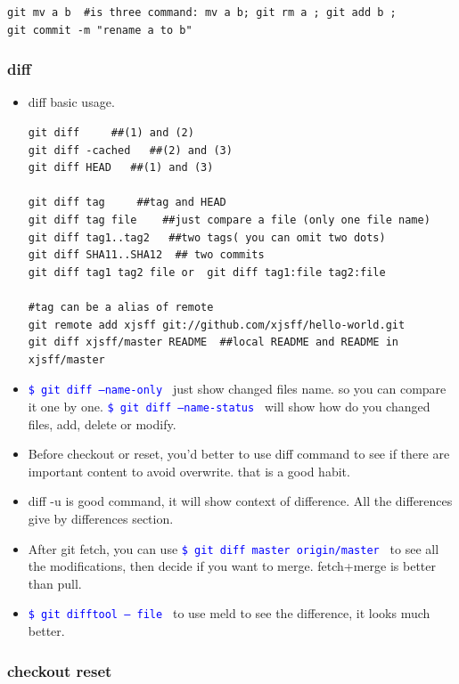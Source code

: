 \documentclass[a4paper,12pt,twoside]{book}
\newcommand{\linuxcommand}[1]{\texttt{\textcolor{blue}{\$ #1 \Pisymbol{psy}{191}}}}
\begin{document}
\begin{itemize}
\begin{itemize}
\begin{verbatim}
git mv a b  #is three command: mv a b; git rm a ; git add b ;
git commit -m "rename a to b"
\end{verbatim}

\subsubsection{diff}
\begin{itemize}
\item diff basic usage. 

\begin{verbatim}
git diff     ##(1) and (2)
git diff -cached   ##(2) and (3)
git diff HEAD   ##(1) and (3)

git diff tag     ##tag and HEAD
git diff tag file    ##just compare a file (only one file name)
git diff tag1..tag2   ##two tags( you can omit two dots)
git diff SHA11..SHA12  ## two commits
git diff tag1 tag2 file or  git diff tag1:file tag2:file

#tag can be a alias of remote
git remote add xjsff git://github.com/xjsff/hello-world.git
git diff xjsff/master README  ##local README and README in xjsff/master
\end{verbatim}
		\item \linuxcommand{git diff --name-only} just show changed files name. so you can compare it one by one.  \linuxcommand{git diff --name-status} will show how do you changed files, add, delete or modify. 

		\item Before checkout or reset, you'd better to use diff command to see if there are important content to avoid overwrite. that is a good habit. 

		\item    diff -u is good command, it will show context of difference.  All the differences give by differences section.
   
\item  After git fetch, you can use \linuxcommand{git diff master origin/master} to see all the modifications, then decide if you want to merge. fetch+merge is better than pull.
   
\item \linuxcommand{git difftool -- file} to use meld to see the difference, it looks much better.
\end{itemize}
\subsubsection{checkout reset}


\end{itemize}
\end{itemize}
\end{document}

